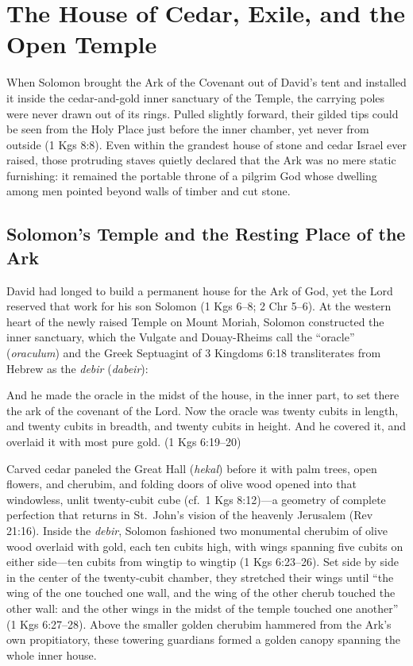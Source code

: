 \section{The House of Cedar, Exile, and the Open Temple}\label{sec:house-of-cedar-hidden-promise}

When Solomon brought the Ark of the Covenant out of David's tent and installed it inside the cedar-and-gold inner sanctuary of the Temple, the carrying poles were never drawn out of its rings. Pulled slightly forward, their gilded tips could be seen from the Holy Place just before the inner chamber, yet never from outside (1 Kgs 8:8). Even within the grandest house of stone and cedar Israel ever raised, those protruding staves quietly declared that the Ark was no mere static furnishing: it remained the portable throne of a pilgrim God whose dwelling among men pointed beyond walls of timber and cut stone.

\subsection{Solomon's Temple and the Resting Place of the Ark}

David had longed to build a permanent house for the Ark of God, yet the Lord reserved that work for his son Solomon (1 Kgs 6--8; 2 Chr 5--6). At the western heart of the newly raised Temple on Mount Moriah, Solomon constructed the inner sanctuary, which the Vulgate and Douay-Rheims call the ``oracle'' (\textit{oraculum}) and the Greek Septuagint of 3 Kingdoms 6:18 transliterates from Hebrew as the \textit{debir} (\textit{dabeir}):

\begin{scriptureblock}
And he made the oracle in the midst of the house, in the inner part, to set there the ark of the covenant of the Lord. Now the oracle was twenty cubits in length, and twenty cubits in breadth, and twenty cubits in height. And he covered it, and overlaid it with most pure gold. \textnormal{(1 Kgs 6:19--20)}
\end{scriptureblock}

Carved cedar paneled the Great Hall (\textit{hekal}) before it with palm trees, open flowers, and cherubim, and folding doors of olive wood opened into that windowless, unlit twenty-cubit cube (cf.\ 1 Kgs 8:12)---a geometry of complete perfection that returns in St.\ John's vision of the heavenly Jerusalem (Rev 21:16). Inside the \textit{debir}, Solomon fashioned two monumental cherubim of olive wood overlaid with gold, each ten cubits high, with wings spanning five cubits on either side---ten cubits from wingtip to wingtip (1 Kgs 6:23--26). Set side by side in the center of the twenty-cubit chamber, they stretched their wings until ``the wing of the one touched one wall, and the wing of the other cherub touched the other wall: and the other wings in the midst of the temple touched one another'' (1 Kgs 6:27--28). Above the smaller golden cherubim hammered from the Ark's own propitiatory, these towering guardians formed a golden canopy spanning the whole inner house.

